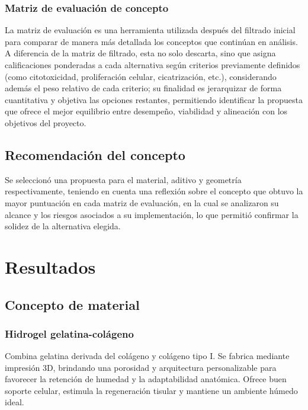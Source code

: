 \documentclass[../../DocumentoCompleto.tex]{subfiles}
\begin{document}
    \subsubsection{Matriz de evaluación de concepto}
La matriz de evaluación es una herramienta utilizada después del filtrado inicial para comparar de manera más detallada los conceptos que continúan en análisis. A diferencia de la matriz de filtrado, esta no solo descarta, sino que asigna calificaciones ponderadas a cada alternativa según criterios previamente definidos (como citotoxicidad, proliferación celular, cicatrización, etc.), considerando además el peso relativo de cada criterio; su finalidad es jerarquizar de forma cuantitativa y objetiva las opciones restantes, permitiendo identificar la propuesta que ofrece el mejor equilibrio entre desempeño, viabilidad y alineación con los objetivos del proyecto.

 
  \subsection{Recomendación del concepto}
Se seleccionó una propuesta para el material, aditivo y geometría respectivamente, teniendo en cuenta una reflexión sobre el concepto que obtuvo la mayor puntuación en cada matriz de evaluación, en la cual se analizaron su alcance y los riesgos asociados a su implementación, lo que permitió confirmar la solidez de la alternativa elegida.


\section{Resultados}



  \subsection{Concepto de material}


    \subsubsection{Hidrogel gelatina-colágeno}
Combina gelatina derivada del colágeno y colágeno tipo I. Se fabrica mediante impresión 3D, brindando una porosidad y arquitectura personalizable para favorecer la retención de humedad y la adaptabilidad anatómica. Ofrece buen soporte celular, estimula la regeneración tisular y mantiene un ambiente húmedo ideal. \cite{Li2022}
\end{document}

